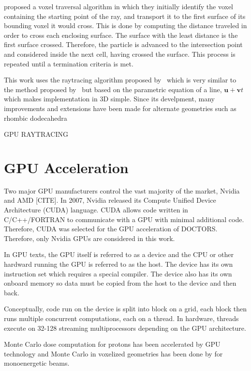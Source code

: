 \citet{ref:clearyj} proposed a voxel traversal algorithm in which they initially identify the voxel containing the starting point of the ray, and transport it to the first surface of its bounding voxel it would cross. This is done by computing the distance traveled in order to cross each enclosing surface. The surface with the least distance is the first surface crossed. Therefore, the particle is advanced to the intersection point and considered inside the next cell, having crossed the surface. This process is repeated until a termination criteria is met.

This work uses the raytracing algorithm proposed by~\citet{ref:wooa} which is very similar to the method proposed by~\citet{ref:clearyj} but based on the parametric equation of a line, $\boldsymbol{u} + \boldsymbol{v}t$ which makes implementation in 3D simple. Since its develpment, many improvements and extensions have been made for alternate geometries such as rhombic dodecahedra~\citep{ref:hel}

GPU RAYTRACING

\section{GPU Acceleration}

Two major GPU manufacturers control the vast majority of the market, Nvidia and AMD [CITE]. In 2007, Nvidia released its Compute Unified Device Architecture (CUDA) language. CUDA allows code written in C/C++/FORTRAN to communicate with a GPU with minimal additional code. Therefore, CUDA was selected for the GPU acceleration of DOCTORS. Therefore, only Nvidia GPUs are considered in this work.

In GPU texts, the GPU itself is referred to as a device and the CPU or other hardward running the GPU is referred to as the host. The device has its own instruction set which requires a special compiler. The device also has its own onboard memory so data must be copied from the host to the device and then back.

Conceptually, code run on the device is split into block on a grid, each block then runs multiple concurrent computations, each on a thread. In hardware, threads execute on 32-128 streaming multiprocessors depending on the GPU architecture.

Monte Carlo dose computation for protons has been accelerated by GPU technology \citep{ref:jiax} and Monte Carlo in voxelized geometries has been done by \citep{ref:hissoinys} for monoenergetic beams.

\endinput
